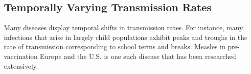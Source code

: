 \documentclass{article}
\begin{document}
\subsection{Temporally Varying Transmission Rates}
Many diseases display temporal shifts in transmission rates. For instance, many infections that arise in largely child populations exhibit peaks and troughs in the rate of transmission corresponding to school terms and breaks. Measles in pre-vaccination Europe and the U.S. is one such disease that has been researched extensively. 
\end{document}
